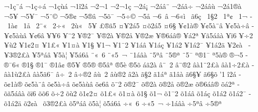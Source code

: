 {^^ac1^^e7^^a8^^e1
^^ac1^^e7^^f7^^e1
^^ac1^^e7^^f9^^e1
^^ac1^^ee2^^e1
^^ac2^^ac1^^ad
^^ac2^^ac1^^e7
^^ac2^^e1^^a1
^^ac2^^e1^^e2^^a8
^^ac2^^e1^^e2^^f7
^^ac2^^e1^^e2^^f9
^^ac2^^e11^^ae^^e0
^^ac5^^a5
^^ac5^^ad^^a5^^af
^^ac5^^ad^^a8^^a9
^^ac5^^ad^^ae^^a2
^^ac5^^ad^^ae^^e2
^^ac5^^ad^^f5^^af
^^ac5^^ad^^f7^^a9
^^ac5^^e5
^^ac6^^a0^^e2
^^ac6^^ab^^ec
^^ad^^a0^^e36^^e7
^^ad^^a01^^a72
^^ad^^a01^^aa^^a2
^^ad^^a01^^ac^^ad
^^ad^^a01^^e0^^a2
^^ad^^a01^^e5
^^ad^^a02^^a8^^ab
^^ad^^a02^^f7^^ab
^^ad^^a02^^f9^^ab
^^ad^^a05^^a5
^^ad^^a3^^ae^^e35
^^ad^^a4^^a52^^e15
^^ad^^a4^^f52^^e15
^^ad^^a46^^a7
^^ad^^a5^^a21^^e0^^ae
^^ad^^a5^^a25^^e0^^a8^^e2
^^ad^^a5^^a25^^e0^^f7^^e2
^^ad^^a5^^a25^^e0^^f9^^e2
^^ad^^a5^^a26^^e2
^^ad^^a5^^a56
^^ad^^a5^^a82
^^ad^^a5^^ae2^^af
^^ad^^a5^^ae2^^e0
^^ad^^a5^^ae2^^e5
^^ad^^a5^^ae2^^e6
^^ad^^a5^^ae6^^e1^^e2^^ae
^^ad^^a5^^e12^^aa
^^ad^^a5^^e35^^e1^^e2^^e0
^^ad^^a5^^ef6
^^ad^^a5^^f72
^^ad^^a5^^f92
^^ad^^a51^^a22^^a4
^^ad^^a51^^a3^^ab
^^ad^^a51^^a4^^e0
^^ad^^a51^^a7^^ad
^^ad^^a51^^ac^^ad
^^ad^^a51^^af2
^^ad^^a51^^e1^^e2
^^ad^^a51^^e1^^e7
^^ad^^a51^^e12^^ad
^^ad^^a51^^e12^^af
^^ad^^a51^^e12^^e4
^^ad^^a52^^a2^^e0^^a0
^^ad^^a53^^ae2^^a3^^e0
^^ad^^a55^^aa^^e1^^e2
^^ad^^a55^^e0^^a6
^^ad^^a55^^e16^^e5
^^ad^^a8^^ab^^a06
^^ad^^a8^^ab5^^a0^^ac
^^ad^^a81^^e1^^e2^^e0
^^ad^^a85^^aa^^e2
^^ad^^a85^^ae^^aa
^^ad^^a85^^af
^^ad^^aa^^ae1^^af
^^ad^^aa5^^e0^^ae
^^ad^^ae^^ac5^^ad
^^ad^^ae^^af6^^ab
^^ad^^ae1^^a7
^^ad^^ae1^^af
^^ad^^ae1^^e2^^a2
^^ad^^ae5^^a5
^^ad^^ae5^^ae
^^ad^^ae5^^e2^^aa
^^ad^^ae5^^e8
^^ad^^ae5^^f5
^^ad^^e1^^e32^^e0
^^ad^^e2^^a8^^a02
^^ad^^e2^^a8^^ae2
^^ad^^e2^^e01^^a82^^a3^^e0
^^ad^^e2^^e01^^f72^^a3^^e0
^^ad^^e2^^e01^^f92^^a3^^e0
^^ad^^e2^^e05^^e36^^af
^^ad^^e2^^f7^^a02
^^ad^^e2^^f7^^ae2
^^ad^^e2^^f9^^a02
^^ad^^e2^^f9^^ae2
^^ad^^e22^^e0
^^ad^^e3^^a72
^^ad^^e31^^e1^^aa
^^ad^^e31^^e2^^e0
^^ad^^e36^^a7^^a5
^^ad^^e36^^a7^^f5
^^ad'1
^^ad^^ee2^^e1
^^ad^^f5^^a21^^e0^^ae
^^ad^^f5^^a25^^e0^^a8^^e2
^^ad^^f5^^a25^^e0^^f7^^e2
^^ad^^f5^^a25^^e0^^f9^^e2
^^ad^^f5^^a26^^e2
^^ad^^f5^^a82
^^ad^^f5^^ae2^^af
^^ad^^f5^^ae2^^e0
^^ad^^f5^^ae2^^e5
^^ad^^f5^^ae2^^e6
^^ad^^f5^^ae6^^e1^^e2^^ae
^^ad^^f5^^e12^^aa
^^ad^^f5^^e35^^e1^^e2^^e0
^^ad^^f5^^ef6
^^ad^^f5^^f56
^^ad^^f5^^f72
^^ad^^f5^^f92
^^ad^^f51^^a22^^a4
^^ad^^f51^^a3^^ab
^^ad^^f51^^a4^^e0
^^ad^^f51^^a7^^ad
^^ad^^f51^^ac^^ad
^^ad^^f51^^af2
^^ad^^f51^^e1^^e2
^^ad^^f51^^e1^^e7
^^ad^^f51^^e12^^ad
^^ad^^f51^^e12^^af
^^ad^^f51^^e12^^e4
^^ad^^f52^^a2^^e0^^a0
^^ad^^f53^^ae2^^a3^^e0
^^ad^^f55^^aa^^e1^^e2
^^ad^^f55^^e0^^a6
^^ad^^f55^^e16^^e5
^^ad^^f7^^ab^^a06
^^ad^^f7^^ab5^^a0^^ac
^^ad^^f71^^e1^^e2^^e0
^^ad^^f75^^aa^^e2
^^ad^^f75^^ae^^aa
}
